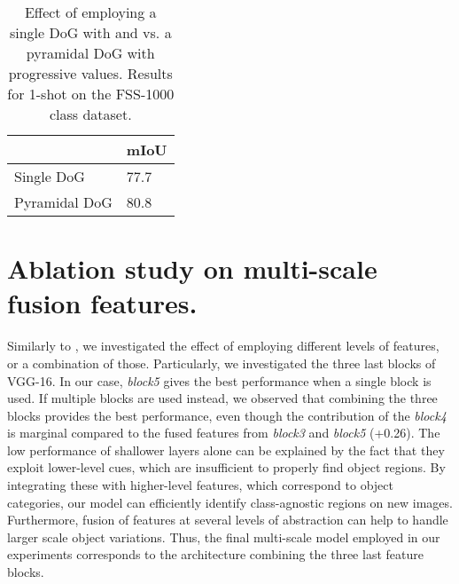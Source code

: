 \documentclass[runningheads]{llncs}
\begin{document}
\begin{table}[h!]
    \centering
    \caption{Effect of employing a single DoG with  and  vs. a pyramidal DoG with progressive  values. Results for 1-shot on the FSS-1000 class dataset.}
    \begin{tabular}{p{} p{}}
    \hline
         & mIoU \\
    \hline     
    \hline
    
   Single DoG & 77.7 \\
   Pyramidal DoG & 80.8\\
    \hline
    \end{tabular}
    \label{tab:sigma_pyr}
\end{table}



\section{Ablation study on multi-scale fusion features.}Similarly to \cite{zhang2019canet}, we investigated the effect of employing different levels of features, or a combination of those. Particularly, we investigated the three last blocks of VGG-16. In our case, \textit{block5} gives the best performance when a single block is used. If multiple blocks are used instead, we observed that combining the three blocks provides the best performance, even though the contribution of the \textit{block4} is marginal compared to the fused features from \textit{block3} and \textit{block5} (+0.26). The low performance of shallower layers alone can be explained by the fact that they exploit lower-level cues, which are insufficient to properly find object regions. By integrating these with higher-level features, which correspond to object categories, our model can efficiently identify class-agnostic regions on new images. Furthermore, fusion of features at several levels of abstraction can help to handle larger scale object variations. Thus, the final multi-scale model employed in our experiments corresponds to the architecture combining the three last feature blocks.
\end{document}
